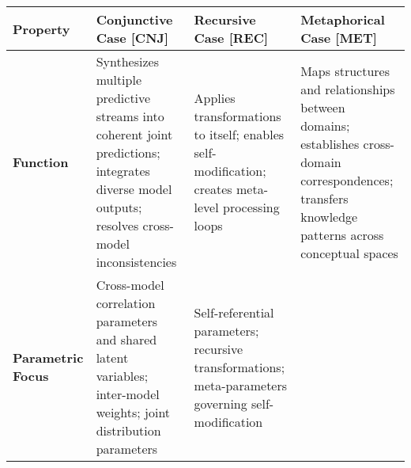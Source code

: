 \documentclass[
]{book}
\begin{document}
\begin{longtable}[]{@{}llll@{}}
\toprule
\begin{minipage}[b]{0.11\columnwidth}\raggedright
Property\strut
\end{minipage} & \begin{minipage}[b]{0.26\columnwidth}\raggedright
Conjunctive Case {[}CNJ{]}\strut
\end{minipage} & \begin{minipage}[b]{0.24\columnwidth}\raggedright
Recursive Case {[}REC{]}\strut
\end{minipage} & \begin{minipage}[b]{0.27\columnwidth}\raggedright
Metaphorical Case {[}MET{]}\strut
\end{minipage}\tabularnewline
\midrule
\endhead
\begin{minipage}[t]{0.11\columnwidth}\raggedright
\textbf{Function}\strut
\end{minipage} & \begin{minipage}[t]{0.26\columnwidth}\raggedright
Synthesizes multiple predictive streams into coherent joint predictions;
integrates diverse model outputs; resolves cross-model
inconsistencies\strut
\end{minipage} & \begin{minipage}[t]{0.24\columnwidth}\raggedright
Applies transformations to itself; enables self-modification; creates
meta-level processing loops\strut
\end{minipage} & \begin{minipage}[t]{0.27\columnwidth}\raggedright
Maps structures and relationships between domains; establishes
cross-domain correspondences; transfers knowledge patterns across
conceptual spaces\strut
\end{minipage}\tabularnewline
\begin{minipage}[t]{0.11\columnwidth}\raggedright
\textbf{Parametric Focus}\strut
\end{minipage} & \begin{minipage}[t]{0.26\columnwidth}\raggedright
Cross-model correlation parameters and shared latent variables;
inter-model weights; joint distribution parameters\strut
\end{minipage} & \begin{minipage}[t]{0.24\columnwidth}\raggedright
Self-referential parameters; recursive transformations; meta-parameters
governing self-modification\strut
\end{minipage} & \begin{minipage}[t]{0.27\columnwidth}\raggedright

\end{minipage}
\end{longtable}
\end{document}
